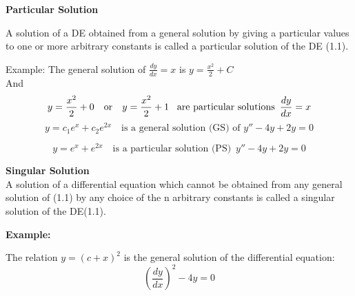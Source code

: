 \documentclass[a4aper,12pt]{report}
\begin{document}
\noindent\textbf{Particular Solution} 
\begin{center}
\end{center}
A solution of a DE obtained from a general solution by giving a particular values to one or more arbitrary constants is called a particular solution of the DE (1.1).
\vspace{5pt}
\begin{tcolorbox}[breakable, title = {\textbf{Example : }}]
    Example: The general solution of \( \frac{dy}{dx} = x \) is 
$
y = \frac{x^2}{2} + C
$
\\ And 
\[
y = \frac{x^2}{2} + 0 \quad \text{or} \quad y = \frac{x^2}{2} + 1 \text{\,\,\,  
are particular solutions} \,\,\, \dfrac{dy}{dx}=x
\]
\[
y = c_1 e^x + c_2 e^{2x} \quad \text{is a general solution (GS) of } y'' - 4y + 2y = 0
\]

\[
y = e^x + e^{2x} \quad \text{is a particular solution (PS)} \,\,\, y'' - 4y + 2y = 0
\]
\end{tcolorbox}

\vspace{1em}
\noindent \textbf{Singular Solution} \\ [5pt]
A solution of a differential equation which cannot be obtained from any general solution of (1.1) by any choice of the n arbitrary constants is called a singular solution of the DE(1.1).

\begin{tcolorbox}[breakable, title = {\textbf{Example : }}]
    
\end{tcolorbox}
\textbf{Example:}

The relation \( y = (c + x)^2 \) is the general solution of the differential equation:
\[
\left( \frac{dy}{dx} \right)^2 - 4y = 0
\]
\end{document}
